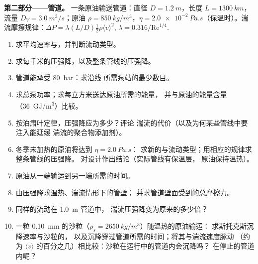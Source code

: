 \begin{problem}
\medskip
\noindent\textbf{第二部分——管道。}
一条原油输送管道：直径 $D = \qty{1.2}{m}$，长度 $L = \qty{1300}{km}$，
流量 $D_V = \qty{3.0}{m^3/s}$；原油 $\rho = \qty{850}{kg/m^3}$，$\eta =
\qty{2.0e-2}{Pa.s}$（保温时）。湍流摩擦规律：$\Delta P = \lambda
(L/D)\tfrac12\rho\langle v\rangle^2$, $\lambda = 0.316/\mathrm{Re}^{1/4}$.
\begin{enumerate}[resume]
  \item 求平均速率与，并判断流动类型。
  \item 求每千米的压强降，以及整条管线的压强降。
  \item 管道能承受 \qty{80}{bar}：求沿线
        所需泵站的最少数目。
  \item 求总泵功率；求每立方米送达原油所需的能量，
        并与原油的能量含量（\qty{36}{GJ/m^3}）比较。
  \item 按泊肃叶定律，压强降应为多少？评论
        湍流的代价（以及为何某些管线中要注入能延缓
        湍流的聚合物添加剂）。
  \item 冬季未加热的原油将达到 $\eta = \qty{2.0}{Pa.s}$：
        求新的与流动类型；用相应的规律求整条管线的压强降。
        对设计作出结论（实际管线有保温层，
        原油保持温热）。
  \item 原油从一端输运到另一端所需的时间。
  \item 由压强降求温热、湍流情形下的管壁；
        并求管道壁面受到的总摩擦力。
  \item 同样的流动在 \qty{1.0}{m} 管道中，
        湍流压强降变为原来的多少倍？
  \item 一粒 \qty{0.10}{mm} 的沙粒（$\rho_s = \qty{2650}{kg/m^3}$）随温热的原油输运：
        求斯托克斯沉降速率与沙粒的，
        以及沉降穿过管道所需的时间；将其与湍流速度脉动
        （约为 $\langle v
        \rangle$ 的百分之几）相比较：沙粒在运行中的管道内会沉降吗？
        在停止的管道内呢？
\end{enumerate}


\end{problem}
